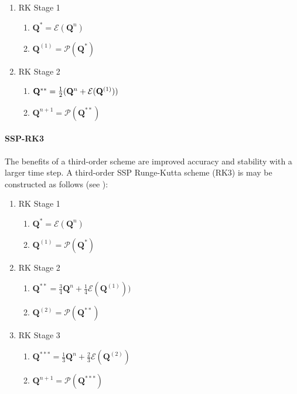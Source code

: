 \documentclass[11pt]{article}
\begin{document}
\begin{enumerate}
\item RK Stage 1
    \begin{enumerate}
    \item $\mathbf{Q}^{*} = \mathcal{E}(\mathbf{Q}^n)$
    \item $\mathbf{Q}^{(1)} = \mathcal{P}(\mathbf{Q}^*)$
    \end{enumerate}
\item RK Stage 2
    \begin{enumerate}
    \item $\mathbf{Q}^{**} = \mbox{$\frac{1}{2}$} (\mathbf{Q}^n + \mathcal{E}(\mathbf{Q}^{(1)}))$
    \item $\mathbf{Q}^{n+1} = \mathcal{P}(\mathbf{Q}^{**})$
    \end{enumerate}
\end{enumerate}

\paragraph{SSP-RK3} The benefits of a third-order scheme are improved accuracy and stability with a larger time step.  A third-order SSP Runge-Kutta scheme (RK3) is may be constructed as follows (see \cite{Shu}):

\begin{enumerate}
\item RK Stage 1
    \begin{enumerate}
    \item $\mathbf{Q}^{*} = \mathcal{E}(\mathbf{Q}^n)$
    \item $\mathbf{Q}^{(1)} = \mathcal{P}(\mathbf{Q}^*)$
    \end{enumerate}
\item RK Stage 2
    \begin{enumerate}
    \item $\mathbf{Q}^{**} = \mbox{$\frac{3}{4}$} \mathbf{Q}^n + \mbox{$\frac{1}{4}$}\mathcal{E}(\mathbf{Q}^{(1)}))$
    \item $\mathbf{Q}^{(2)} = \mathcal{P}(\mathbf{Q}^{**})$
    \end{enumerate}
\item RK Stage 3
    \begin{enumerate}
    \item $\mathbf{Q}^{***} = \mbox{$\frac{1}{3}$} \mathbf{Q}^n + \mbox{$\frac{2}{3}$}\mathcal{E}(\mathbf{Q}^{(2)})$
    \item $\mathbf{Q}^{n+1} = \mathcal{P}(\mathbf{Q}^{***})$
    \end{enumerate}
\end{enumerate}
\end{document}
